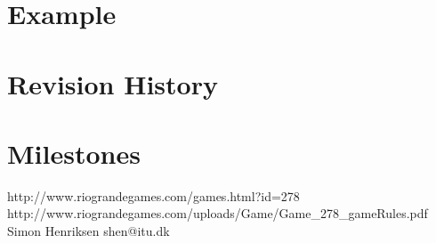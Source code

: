 \documentclass[12pt,a4paper,notitlepage]{article}
\begin{document}
\section{Example}
\section{Revision History}
\section{Milestones}



\begin{thebibliography}{9}
 http://www.riograndegames.com/games.html?id=278
 http://www.riograndegames.com/uploads/Game/Game\_278\_gameRules.pdf
 Simon Henriksen shen{\makeatletter @\makeatother}itu.dk
\end{thebibliography}
\end{document}
